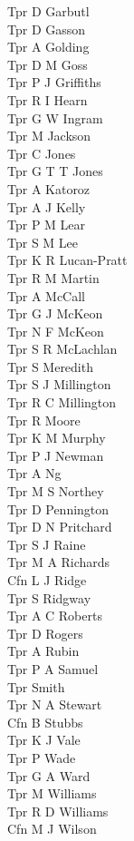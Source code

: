 \begin{multicols}{3}
  Tpr D Garbutl \\
  Tpr D Gasson \\
  Tpr A Golding \\
  Tpr D M Goss \\
  Tpr P J Griffiths \\
  Tpr R I Hearn \\
  Tpr G W Ingram \\
  Tpr M Jackson \\
  Tpr C Jones \\
  Tpr G T T Jones \\
  Tpr A Katoroz \\
  Tpr A J Kelly \\
  Tpr P M Lear \\
  Tpr S M Lee \\
  Tpr K R Lucan-Pratt \\
  Tpr R M Martin \\
  Tpr A McCall \\
  Tpr G J McKeon \\
  Tpr N F McKeon \\
  Tpr S R McLachlan \\
  Tpr S Meredith \\
  Tpr S J Millington \\
  Tpr R C Millington \\
  Tpr R Moore \\
  Tpr K M Murphy \\
  Tpr P J Newman \\
  Tpr A Ng \\
  Tpr M S Northey \\
  Tpr D Pennington \\
  Tpr D N Pritchard \\
  Tpr S J Raine \\
  Tpr M A Richards \\
  Cfn L J Ridge \\
  Tpr S Ridgway \\
  Tpr A C Roberts \\
  Tpr D Rogers \\
  Tpr A Rubin \\
  Tpr P A Samuel \\
  Tpr Smith \\
  Tpr N A Stewart \\
  Cfn B Stubbs \\
  Tpr K J Vale \\
  Tpr P Wade \\
  Tpr G A Ward \\
  Tpr M Williams \\
  Tpr R D Williams \\
  Cfn M J Wilson \\
\end{multicols}

